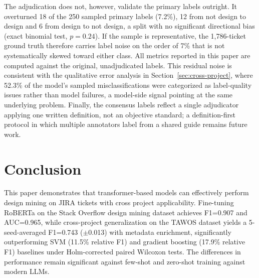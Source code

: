 \documentclass[preprint,12pt]{elsarticle}
\begin{document}
The adjudication does not, however, validate the primary labels outright. It overturned 18 of the 250 sampled primary labels (7.2\%), 12 from not design to design and 6 from design to not design, a split with no significant directional bias (exact binomial test, $p=0.24$). If the sample is representative, the 1,786-ticket ground truth therefore carries label noise on the order of 7\% that is not systematically skewed toward either class. All metrics reported in this paper are computed against the original, unadjudicated labels. This residual noise is consistent with the qualitative error analysis in Section~\ref{sec:cross-project}, where 52.3\% of the model's sampled misclassifications were categorized as label-quality issues rather than model failures, a model-side signal pointing at the same underlying problem. Finally, the consensus labels reflect a single adjudicator applying one written definition, not an objective standard; a definition-first protocol in which multiple annotators label from a shared guide remains future work. 

\section{Conclusion}

This paper demonstrates that transformer-based models can effectively perform design mining on JIRA tickets with cross project applicability. Fine-tuning RoBERTa on the Stack Overflow design mining dataset achieves F1=0.907 and AUC=0.965, while cross-project generalization on the TAWOS dataset yields a 5-seed-averaged F1=0.743 ($\pm$0.013) with metadata enrichment, significantly outperforming SVM (11.5\% relative F1) and gradient boosting (17.9\% relative F1) baselines under Holm-corrected paired Wilcoxon tests. The differences in performance remain significant against few-shot and zero-shot training against modern LLMs. 
\end{document}
